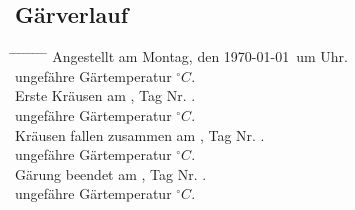 \documentclass[12pt,oneside,a4paper]{scrartcl}
\begin{document}
{\subsection*{Gärverlauf}
	\begin{tabbing}
		\hspace{1cm} \= \hspace{1cm} \= \hspace{1cm} \= \hspace{1cm} \= \hspace{1cm} \= \hspace{1cm} \= \hspace{1cm} \= \hspace{1cm} \= \kill
		\> Angestellt am Montag, den \today \ um \hspace{2.5cm} Uhr.\\
		\> \> ungefähre Gärtemperatur \hspace{2.5cm} $^\circ C$.\\
		\> Erste Kräusen am \hspace{4cm}, Tag Nr.\hspace{2.5cm} .\\
		\> \> ungefähre Gärtemperatur \hspace{2.5cm}$^\circ C$.\\
		\> Kräusen fallen zusammen am \hspace{4cm}, Tag Nr. \hspace{2.5cm}.\\
		\> \> ungefähre Gärtemperatur \hspace{2.5cm}$^\circ C$.\\
		\> Gärung beendet am \hspace{4cm}, Tag Nr. \hspace{2.5cm}.\\
		\> \> ungefähre Gärtemperatur \hspace{2.5cm}$^\circ C$.
	\end{tabbing}
%
}
\end{document}
